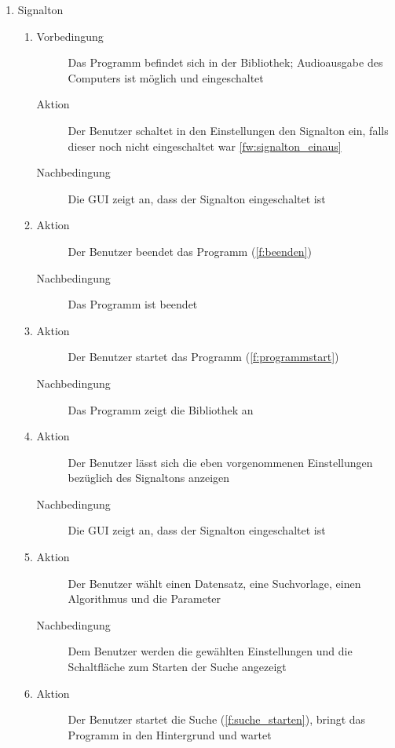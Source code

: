 \begin{enumerate} [label=\bfseries /TSW \arabic*0/, leftmargin=*]
	\item Signalton \label{ts:signalton}
	\begin{enumerate}[leftmargin=0pt]
		\item
		\begin{description}
			\item[Vorbedingung] Das Programm befindet sich in der Bibliothek; Audioausgabe des Computers ist möglich und eingeschaltet
			\item[Aktion] Der Benutzer schaltet in den Einstellungen den Signalton ein, falls dieser noch nicht eingeschaltet war \ref{fw:signalton_einaus}
			\item[Nachbedingung] Die GUI zeigt an, dass der Signalton eingeschaltet ist
		\end{description}
		\item
		\begin{description}
			\item[Aktion] Der Benutzer beendet das Programm (\ref{f:beenden})
			\item[Nachbedingung] Das Programm ist beendet
		\end{description}
		\item
		\begin{description}
			\item[Aktion] Der Benutzer startet das Programm (\ref{f:programmstart})
			\item[Nachbedingung] Das Programm zeigt die Bibliothek an
		\end{description}
		\item
		\begin{description}
			\item[Aktion] Der Benutzer lässt sich die eben vorgenommenen Einstellungen bezüglich des Signaltons anzeigen
			\item[Nachbedingung] Die GUI zeigt an, dass der Signalton eingeschaltet ist
		\end{description}
		\item
		\begin{description}
			\item[Aktion] Der Benutzer wählt einen Datensatz, eine Suchvorlage, einen Algorithmus und die Parameter
			\item[Nachbedingung] Dem Benutzer werden die gewählten Einstellungen und die Schaltfläche zum Starten der Suche angezeigt
		\end{description}
		\item
		\begin{description}
			\item[Aktion] Der Benutzer startet die Suche (\ref{f:suche_starten}), bringt das Programm in den Hintergrund und wartet

\end{description}
\end{enumerate}
\end{enumerate}
